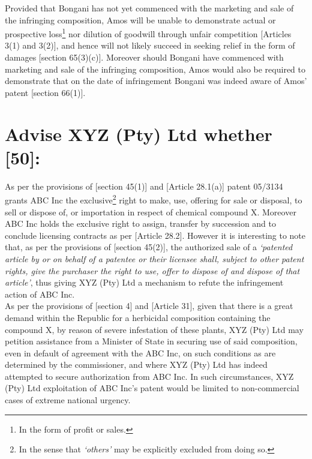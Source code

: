 \documentclass[11pt]{article}
\begin{document}
Provided that Bongani has not yet commenced with the marketing and sale of the
infringing composition, Amos will be unable to demonstrate actual or prospective loss\footnote{In the form of profit or sales.} nor
dilution of goodwill through unfair competition [Articles 3(1) and
3(2)]\cite{wipo96_model_provi_unfair_comp}, and hence will not likely
succeed in seeking relief in the form of damages [section
65(3)(c)]\cite{rsa78_patents_act}. Moreover should Bongani have commenced with
marketing and sale of the infringing composition, Amos would also be required to demonstrate
that on the date of infringement Bongani was indeed aware of Amos' patent
[section 66(1)]\cite{rsa78_patents_act}.
\section{Advise XYZ (Pty) Ltd whether [50]:}
\label{sec:org133961e}
As per the provisions of [section 45(1)]\cite{rsa78_patents_act} and [Article 28.1(a)]\cite{wto17_trips} patent 05/3134 grants ABC Inc
the exclusive\footnote{In the sense that \emph{`others'} may be explicitly excluded from doing so.} right to make, use, offering for sale or
disposal, to sell or dispose of, or importation in respect of chemical compound X. Moreover ABC Inc holds the exclusive right to
assign, transfer by succession and to conclude licensing contracts as per [Article 28.2]\cite{wto17_trips}. However it is
interesting to note that, as per the provisions of [section
45(2)]\cite{rsa78_patents_act}, the authorized sale of a \emph{`patented article by or on behalf of a patentee or their licensee shall, subject to other patent rights, give the purchaser the right to
use, offer to dispose of and dispose of that article'}, thus giving XYZ (Pty) Ltd a mechanism to refute the infringement action of
ABC Inc.\\

As per the provisions of [section 4]\cite{rsa78_patents_act} and [Article 31]\cite{wto17_trips}, given that there is a great demand
within the Republic for a herbicidal composition containing the compound X, by reason of severe infestation of these plants, XYZ
(Pty) Ltd may petition assistance from a Minister of State in securing use of said composition, even in default of agreement with
the ABC Inc, on such conditions as are determined by the commissioner, and where XYZ (Pty) Ltd has indeed attempted to secure
authorization from ABC Inc. In such circumstances, XYZ (Pty) Ltd exploitation of ABC Inc's patent would be limited to
non-commercial cases of extreme national urgency.\\
\end{document}

